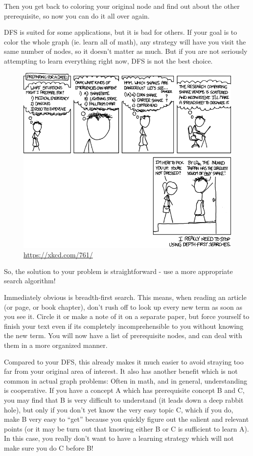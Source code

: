 Then you get back to coloring your original node and find out about the other
prerequisite, so now you can do it all over again.

DFS is suited for some applications, but it is bad for others. If your goal is to color
the whole graph (ie. learn all of math), any strategy will have you visit the same number
of nodes, so it doesn't matter as much. But if you are not seriously attempting to learn
everything right now, DFS is not the best choice.

\begin{figure}[H] \centering \includegraphics[width=.8\textwidth]{Pics/dfs.png}
\captionsetup{labelformat=empty} \caption{\url{https://xkcd.com/761/}} \end{figure}

So, the solution to your problem is straightforward - use a more appropriate search
algorithm!

\thispagestyle{empty}

Immediately obvious is breadth-first search. This means, when reading an article (or page,
or book chapter), don't rush off to look up every new term as soon as you see it. Circle
it or make a note of it on a separate paper, but force yourself to finish your text even
if its completely incomprehensible to you without knowing the new term. You will now have
a list of prerequisite nodes, and can deal with them in a more organized manner.

Compared to your DFS, this already makes it much easier to avoid straying too far from
your original area of interest. It also has another benefit which is not common in actual
graph problems: Often in math, and in general, understanding is cooperative. If you have a
concept A which has prerequisite concept B and C, you may find that B is very difficult to
understand (it leads down a deep rabbit hole), but only if you don't yet know the very
easy topic C, which if you do, make B very easy to ``get'' because you quickly figure out
the salient and relevant points (or it may be turn out that knowing either B or C is
sufficient to learn A). In this case, you really don't want to have a learning strategy
which will not make sure you do C before B!

